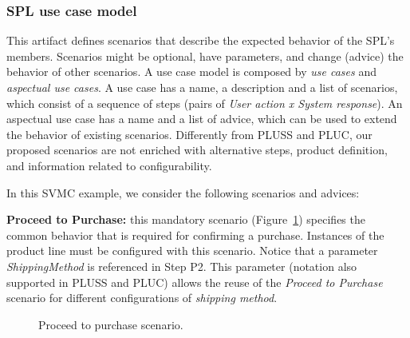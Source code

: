 \subsubsection{SPL use case model}

This artifact defines scenarios that describe the expected behavior of the SPL's
members. Scenarios might be optional, have parameters, and change (advice) the
behavior of other scenarios. A use case model is composed by \emph{use cases} and
\emph{aspectual use cases}. A use case has a name, a description and a list of
scenarios, which consist of a sequence of steps (pairs of \emph{User action x
System response}). An aspectual use case has a name and a list of advice, which
can be used to extend the behavior of existing scenarios. Differently from
PLUSS and PLUC, our proposed scenarios are not enriched with alternative steps,
product definition, and information related to configurability.  

In this SVMC example, we consider the following scenarios and advices:

{\bf Proceed to Purchase:} this mandatory scenario
(Figure~\ref{fig:proceed-to-checkout}) specifies the common behavior that is
required for confirming a purchase. Instances of the product line must be
configured with this scenario. Notice that a parameter
\emph{ShippingMethod} is referenced in Step P2. This parameter (notation
also supported in PLUSS and PLUC) allows the reuse of the \emph{Proceed to
Purchase} scenario for different configurations of \emph{shipping method}. 

\begin{figure}[h]
\caption{Proceed to purchase scenario.}
\label{fig:proceed-to-checkout}
\end{figure}


